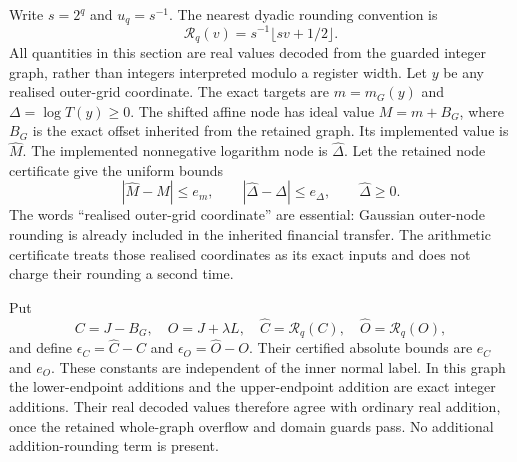 \documentclass[11pt]{article}
\begin{document}
Write $s=2^q$ and $u_q=s^{-1}$. The nearest dyadic rounding convention is
\begin{equation}
 \mathcal R_q(v)=s^{-1}\lfloor sv+1/2\rfloor.
\end{equation}
All quantities in this section are real values decoded from the guarded
integer graph, rather than integers interpreted modulo a register width.
Let $y$ be any realised outer-grid coordinate. The exact targets are
$m=m_G(y)$ and $\Delta=\log T(y)\geq0$. The shifted affine node has ideal
value $M=m+B_G$, where $B_G$ is the exact offset inherited from the retained
graph. Its implemented value is $\widehat M$. The implemented nonnegative
logarithm node is $\widehat\Delta$. Let the retained node certificate give
the uniform bounds
\begin{equation}
 |\widehat M-M|\leq e_m,
 \qquad |\widehat\Delta-\Delta|\leq e_\Delta,
 \qquad \widehat\Delta\geq0.
\end{equation}
The words ``realised outer-grid coordinate'' are essential: Gaussian
outer-node rounding is already included in the inherited financial
transfer. The arithmetic certificate treats those realised coordinates
as its exact inputs and does not charge their rounding a second time.

Put
\begin{equation}
 C=J-B_G,\quad O=J+\lambda L,\quad
 \widehat C=\mathcal R_q(C),\quad
 \widehat O=\mathcal R_q(O),
\end{equation}
and define $\epsilon_C=\widehat C-C$ and
$\epsilon_O=\widehat O-O$. Their certified absolute bounds are
$e_C$ and $e_O$. These constants are independent of the inner normal
label. In this graph the lower-endpoint additions and the upper-endpoint
addition are exact integer additions. Their real decoded values therefore
agree with ordinary real addition, once the retained whole-graph overflow
and domain guards pass. No additional addition-rounding term is present.
\end{document}
